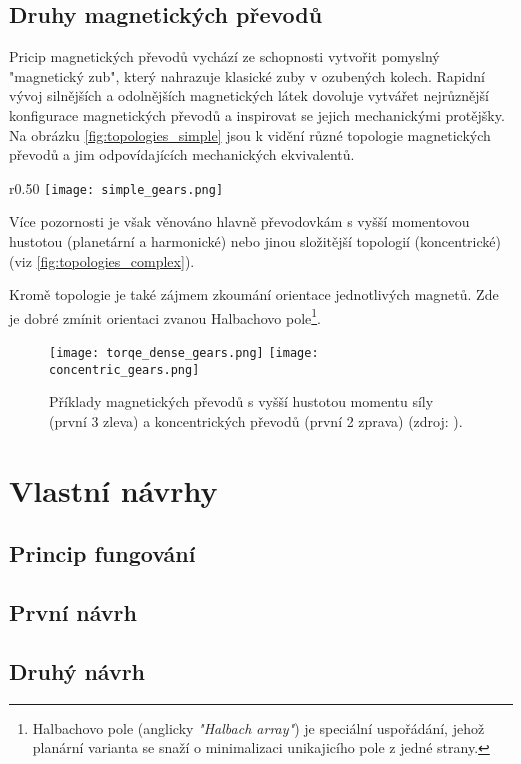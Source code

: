 \subsection{Druhy magnetických převodů}
Pricip magnetických převodů vychází ze schopnosti vytvořit pomyslný "magnetický zub", který nahrazuje klasické zuby v ozubených kolech. Rapidní vývoj silnějších a odolnějších magnetických látek dovoluje vytvářet nejrůznější konfigurace magnetických převodů a inspirovat se jejich mechanickými protějšky. Na obrázku \ref{fig:topologies_simple} jsou k vidění různé topologie magnetických převodů a jim odpovídajících mechanických ekvivalentů.
\begin{wrapfigure}{r}{0.50\textwidth}
    \vspace{-5cm}
    \texttt{[image: simple\_gears.png]}
    \centering
    \caption{Základní magnetické topologie a jejich mechanické ekvivalenty (zdroj: \cite{MG_topologies}).}
    \label{fig:topologies_simple}
\end{wrapfigure}

Více pozornosti je však věnováno hlavně převodovkám s vyšší momentovou hustotou (planetární a harmonické) nebo jinou složitější topologií (koncentrické) (viz \autoref{fig:topologies_complex}).

Kromě topologie je také zájmem zkoumání orientace jednotlivých magnetů. Zde je dobré zmínit orientaci zvanou Halbachovo pole\footnote{Halbachovo pole (anglicky \textit{"Halbach array"}) je speciální uspořádání, jehož planární varianta se snaží o minimalizaci unikajicího pole z jedné strany.}.
\begin{figure}[H]
    \texttt{[image: torqe\_dense\_gears.png]}
    \texttt{[image: concentric\_gears.png]}
    \centering
    \caption{Příklady magnetických převodů s vyšší hustotou momentu síly (první 3 zleva) a koncentrických převodů (první 2 zprava) (zdroj: \cite{MG_topologies}).}
    \label{fig:topologies_complex}
\end{figure}

\section{Vlastní návrhy}


\subsection{Princip fungování}

\subsection{První návrh}



\subsection{Druhý návrh}


